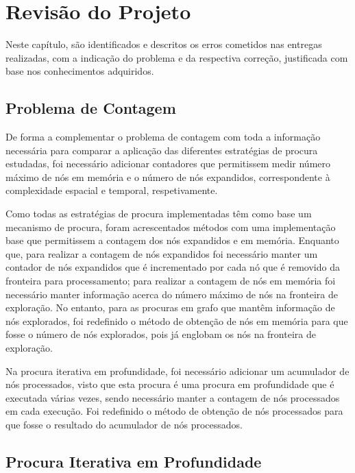 \chapter{Revisão do Projeto}\label{ch:revisao-projeto}

Neste capítulo, são identificados e descritos os erros cometidos nas entregas realizadas, com a indicação do problema e da respectiva correção, justificada com base nos conhecimentos adquiridos.

\section{Problema de Contagem}\label{sec:problema-de-contagem}

De forma a complementar o problema de contagem com toda a informação necessária para comparar a aplicação das diferentes estratégias de procura estudadas, foi necessário adicionar contadores que permitissem medir número máximo de nós em memória e o número de nós expandidos, correspondente à complexidade espacial e temporal, respetivamente.

Como todas as estratégias de procura implementadas têm como base um mecanismo de procura, foram acrescentados métodos com uma implementação base que permitissem a contagem dos nós expandidos e em memória.
Enquanto que, para realizar a contagem de nós expandidos foi necessário manter um contador de nós expandidos que é incrementado por cada nó que é removido da fronteira para processamento; para realizar a contagem de nós em memória foi necessário manter informação acerca do número máximo de nós na fronteira de exploração.
No entanto, para as procuras em grafo que mantêm informação de nós explorados, foi redefinido o método de obtenção de nós em memória para que fosse o número de nós explorados, pois já englobam os nós na fronteira de exploração.

Na procura iterativa em profundidade, foi necessário adicionar um acumulador de nós processados, visto que esta procura é uma procura em profundidade que é executada várias vezes, sendo necessário manter a contagem de nós processados em cada execução.
Foi redefinido o método de obtenção de nós processados para que fosse o resultado do acumulador de nós processados.

\section{Procura Iterativa em Profundidade}\label{sec:procura-iterativa-em-profundidade}

